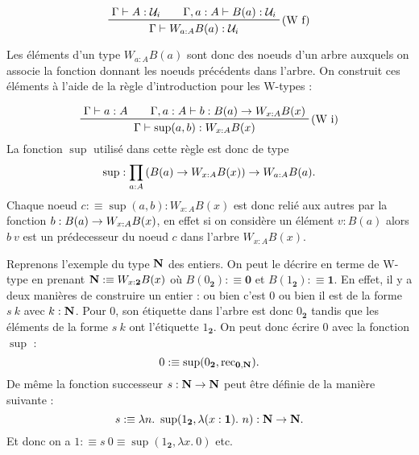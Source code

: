 \documentclass[../../rapport.tex]{subfiles}
\begin{document}
  $$
  \prfinterspace=2em
  \prftree[r]{(W f)}{\Gamma \vdash A : \U_i}{\Gamma, a : A \vdash B(a) : \U_i}{\Gamma \vdash W_{a: A} B(a) : \U_i}
  $$

  Les éléments d'un type $W_{a:A}B(a)$ sont donc des noeuds d'un arbre auxquels on associe la fonction donnant
  les noeuds précédents dans l'arbre. On construit ces éléments à l'aide
  de la règle d'introduction pour les W-types :

  $$
  \prfinterspace=2em
  \prftree[r]{(W i)}{\Gamma \vdash a : A}{\Gamma, a : A \vdash b : B(a) \fun W_{x:A}B(x)}
    {\Gamma \vdash \sup(a, b) : W_{x:A}B(x)}
  $$
  La fonction $\sup$ utilisé dans cette règle est donc de type
  $$\sup : \prod_{a:A}{\left(B(a) \rightarrow W_{x:A}B(x)\right)} \rightarrow W_{a:A}B(a).$$
  Chaque noeud $c :\equiv \sup(a, b) : W_{x:A}B(x)$ est donc relié aux autres par la fonction $b : B(a) \rightarrow W_{x:A}B(x)$,
  en effet si on considère un élément $v : B(a)$ alors $b\ v$ est un prédecesseur du noeud $c$ dans l'arbre $W_{x:A}B(x)$.

  \begin{figure}[ht]
    \centering
  \end{figure}

  Reprenons l'exemple du type $\mathbf N$ des entiers.
  On peut le décrire en terme de W-type en prenant $\mathbf N :\equiv W_{x: \textbf{2}}B(x)$ où $B(0_{\textbf{2}}) :\equiv \textbf{0}$
  et $B(1_{\textbf{2}}) :\equiv \textbf{1}$.
  En effet, il y a deux manières de construire un entier : ou bien c'est 0 ou bien il est de la forme $s\ k$ avec $k : \mathbf N$.
  Pour 0, son étiquette dans l'arbre est donc $0_{\textbf{2}}$ tandis que les éléments de la forme $s\ k$ ont l'étiquette
  $1_{\textbf{2}}$.
  On peut donc écrire 0 avec la fonction $\sup$ :
  $$ 0 :\equiv \sup(0_{\textbf{2}}, \operatorname{rec}_{\textbf{0}, \mathbf N}).$$
  De même la fonction successeur $s : \mathbf N \rightarrow \mathbf N$ peut être définie de la manière suivante :
  $$ s :\equiv \lambda n.\ \sup(1_{\textbf{2}}, \lambda(x : \textbf{1}).\ n) : \N \fun \N.$$
  Et donc on a $1 :\equiv s\ 0 \equiv \sup(1_{\textbf{2}}, \lambda x.\ 0)$ etc.
\end{document}
